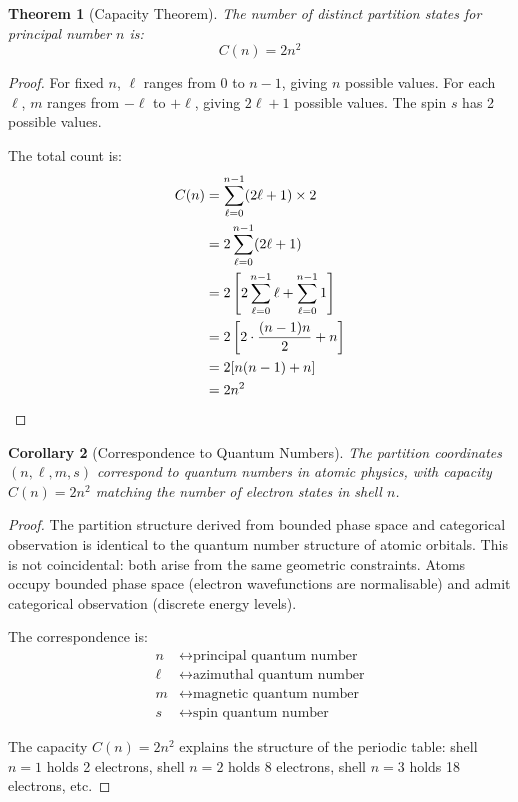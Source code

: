 \documentclass[11pt,twocolumn,a4paper]{article}
\newtheorem{theorem}{Theorem}[section]
\newtheorem{corollary}[theorem]{Corollary}
\theoremstyle{definition}
\theoremstyle{remark}
\begin{document}
\begin{theorem}[Capacity Theorem]
\label{thm:capacity}
The number of distinct partition states for principal number $n$ is:
\begin{equation}
C(n) = 2n^2
\label{eq:capacity}
\end{equation}
\end{theorem}

\begin{proof}
For fixed $n$, $\ell$ ranges from $0$ to $n-1$, giving $n$ possible values. For each $\ell$, $m$ ranges from $-\ell$ to $+\ell$, giving $2\ell+1$ possible values. The spin $s$ has 2 possible values.

The total count is:
\begin{align}
C(n) &= \sum_{\ell=0}^{n-1} (2\ell+1) \times 2 \notag \\
&= 2 \sum_{\ell=0}^{n-1} (2\ell+1) \notag \\
&= 2 \left[2\sum_{\ell=0}^{n-1}\ell + \sum_{\ell=0}^{n-1}1\right] \notag \\
&= 2\left[2 \cdot \frac{(n-1)n}{2} + n\right] \notag \\
&= 2[n(n-1) + n] \notag \\
&= 2n^2
\end{align}
\end{proof}

\begin{corollary}[Correspondence to Quantum Numbers]
\label{cor:quantum_correspondence}
The partition coordinates $(n,\ell,m,s)$ correspond to quantum numbers in atomic physics, with capacity $C(n) = 2n^2$ matching the number of electron states in shell $n$.
\end{corollary}

\begin{proof}
The partition structure derived from bounded phase space and categorical observation is identical to the quantum number structure of atomic orbitals. This is not coincidental: both arise from the same geometric constraints. Atoms occupy bounded phase space (electron wavefunctions are normalisable) and admit categorical observation (discrete energy levels).

The correspondence is:
\begin{align}
n &\leftrightarrow \text{principal quantum number} \\
\ell &\leftrightarrow \text{azimuthal quantum number} \\
m &\leftrightarrow \text{magnetic quantum number} \\
s &\leftrightarrow \text{spin quantum number}
\end{align}

The capacity $C(n) = 2n^2$ explains the structure of the periodic table: shell $n=1$ holds 2 electrons, shell $n=2$ holds 8 electrons, shell $n=3$ holds 18 electrons, etc.
\end{proof}
\end{document}
